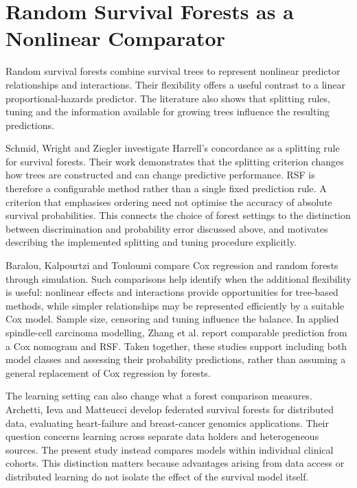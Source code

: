 \section{Random Survival Forests as a Nonlinear Comparator}\label{random-survival-forests-as-a-nonlinear-comparator}

Random survival forests combine survival trees to represent nonlinear predictor relationships and interactions. Their flexibility offers a useful contrast to a linear proportional-hazards predictor. The literature also shows that splitting rules, tuning and the information available for growing trees influence the resulting predictions.

Schmid, Wright and Ziegler \cite{ref19} investigate Harrell's concordance as a splitting rule for survival forests. Their work demonstrates that the splitting criterion changes how trees are constructed and can change predictive performance. RSF is therefore a configurable method rather than a single fixed prediction rule. A criterion that emphasises ordering need not optimise the accuracy of absolute survival probabilities. This connects the choice of forest settings to the distinction between discrimination and probability error discussed above, and motivates describing the implemented splitting and tuning procedure explicitly.

Baralou, Kalpourtzi and Touloumi \cite{ref37} compare Cox regression and random forests through simulation. Such comparisons help identify when the additional flexibility is useful: nonlinear effects and interactions provide opportunities for tree-based methods, while simpler relationships may be represented efficiently by a suitable Cox model. Sample size, censoring and tuning influence the balance. In applied spindle-cell carcinoma modelling, Zhang et al. \cite{ref79} report comparable prediction from a Cox nomogram and RSF. Taken together, these studies support including both model classes and assessing their probability predictions, rather than assuming a general replacement of Cox regression by forests.

The learning setting can also change what a forest comparison measures. Archetti, Ieva and Matteucci \cite{ref49} develop federated survival forests for distributed data, evaluating heart-failure and breast-cancer genomics applications. Their question concerns learning across separate data holders and heterogeneous sources. The present study instead compares models within individual clinical cohorts. This distinction matters because advantages arising from data access or distributed learning do not isolate the effect of the survival model itself.

